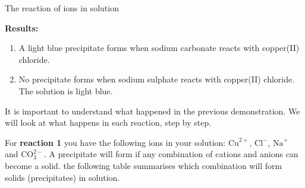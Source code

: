 \begin{g_experiment}{The reaction of ions in solution }
\begin{enumerate}[noitemsep, label=\textbf{\arabic*}. ]
\end{enumerate}
        \par 
      \label{m38719*id340060}\noindent{}\textbf{Results:}
        \newline
      \label{m38719*id340067}\begin{enumerate}[noitemsep, label=\textbf{\arabic*}. ] 
            \label{m38719*uid65}\item A light blue precipitate forms when sodium carbonate reacts with copper(II) chloride.
\label{m38719*uid66}\item No precipitate forms when sodium sulphate reacts with copper(II) chloride. The solution is light blue.
\end{enumerate}
        \par 
\end{g_experiment}
      \label{m38719*id340106}It is important to understand what happened in the previous demonstration. We will look at what happens in each reaction, step by step.\par 
For \textbf{reaction 1} you have the following ions in your solution: ${\text{Cu}}^{2+}$, ${\text{Cl}}^{-}$, ${\text{Na}}^{+}$ and $\text{CO}_{3}^{2-}$. A precipitate will form if any combination of cations and anions can become a solid. the following table summarises which combination will form solids (precipitates) in solution. 
